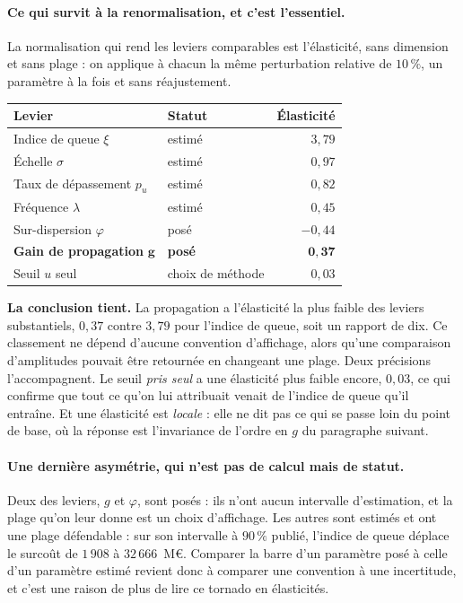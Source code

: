 \paragraph{Ce qui survit à la renormalisation, et c'est l'essentiel.} La normalisation qui rend
les leviers comparables est l'élasticité, sans dimension et sans plage : on applique à
chacun la même perturbation relative de $10\,\%$, un paramètre à la fois et sans réajustement.

\begin{center}\footnotesize
\renewcommand{\arraystretch}{1.15}
\begin{tabular}{@{}l l r@{}}
\toprule
\textbf{Levier} & \textbf{Statut} & \textbf{Élasticité} \\
\midrule
Indice de queue $\xi$ & estimé & $3{,}79$ \\
Échelle $\sigma$ & estimé & $0{,}97$ \\
Taux de dépassement $p_u$ & estimé & $0{,}82$ \\
Fréquence $\lambda$ & estimé & $0{,}45$ \\
Sur-dispersion $\varphi$ & posé & $-0{,}44$ \\
\textbf{Gain de propagation} $\boldsymbol{g}$ & \textbf{posé} & $\mathbf{0{,}37}$ \\
Seuil $u$ seul & choix de méthode & $0{,}03$ \\
\bottomrule
\end{tabular}
\end{center}

\vspace{4pt}
\noindent \textbf{La conclusion tient.} La propagation
a l'élasticité la plus faible des leviers substantiels, $0{,}37$ contre $3{,}79$ pour l'indice de
queue, soit un rapport de dix. Ce classement ne dépend d'aucune convention d'affichage, alors
qu'une comparaison d'amplitudes pouvait être retournée en changeant une plage.
Deux précisions l'accompagnent. Le seuil \emph{pris seul} a une élasticité plus faible encore,
$0{,}03$, ce qui confirme que tout ce qu'on lui attribuait venait de l'indice de queue qu'il
entraîne. Et une élasticité est \emph{locale} : elle ne dit pas ce qui se passe loin du point de
base, où la réponse est l'invariance de l'ordre en $g$ du paragraphe suivant.

\paragraph{Une dernière asymétrie, qui n'est pas de calcul mais de statut.} Deux des leviers,
$g$ et $\varphi$, sont posés : ils n'ont aucun intervalle d'estimation, et la plage
qu'on leur donne est un choix d'affichage. Les autres sont estimés et ont une plage défendable :
sur son intervalle à $90\,\%$ publié, l'indice de queue déplace le surcoût de $1\,908$ à
$32\,666$~M\euro. Comparer la barre d'un paramètre posé à celle d'un paramètre estimé revient
donc à comparer une convention à une incertitude, et c'est une raison de plus de lire ce tornado
en élasticités.

